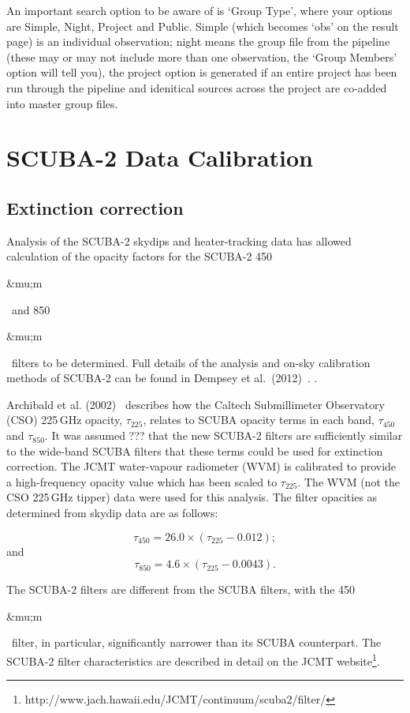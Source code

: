 \documentclass[twoside,11pt]{article}
\newcommand{\micron}{\mbox{\,${\umu}$m}}            %
\newcounter{box}
\newcommand{\htmladdnormallinkfoot}[2]{#1\footnote{#2}}
\newcommand{\xlabel}[1]{}
\renewcommand{\_}{\texttt{\symbol{95}}}
\renewcommand{\micron}{\begin{rawhtml}&mu;m\end{rawhtml}}
\begin{document}
An important search option to be aware of is `Group Type', where your options are Simple, Night, Project and Public. Simple (which becomes `obs' on the result page) is an individual observation; night means the group file from the pipeline (these may or may not include more than one observation, the `Group Members' option will tell you), the project option is generated if an entire project has been run through the pipeline and idenitical sources across the project are co-added into master group files.

\clearpage
\section{\xlabel{calib}SCUBA-2 Data Calibration}
\label{sec:cal}

\subsection{\xlabel{extinction}Extinction correction}

Analysis of the SCUBA-2 skydips and heater-tracking data has allowed calculation of the opacity factors for the SCUBA-2 450\micron\ and 850\micron\ filters to be determined. Full details of the analysis and on-sky calibration methods of SCUBA-2 can be found in Dempsey et al.\ (2012)~\cite{dempsey12}. \cite{dempsey-spie}.

Archibald et al. (2002)~\cite{archibald} describes how the Caltech Submillimeter Observatory (CSO) 225\,GHz opacity, $\tau_{225}$, relates to SCUBA opacity terms in each band, $\tau_{450}$ and $\tau_{850}$. It was assumed ??? that the new SCUBA-2 filters are sufficiently similar to the wide-band SCUBA filters that these terms could be used for extinction correction.  The JCMT water-vapour radiometer (WVM) is calibrated to provide a high-frequency opacity value which has been scaled to $\tau_{225}$. The WVM (not the CSO 225\,GHz tipper) data were used for this analysis. The filter opacities as determined from skydip data are as follows:

\begin{equation}
\tau_{450} = 26.0 \times (\tau_{225} - 0.012);
\end{equation}
and
\begin{equation}
\tau_{850} = 4.6 \times (\tau_{225} - 0.0043).
\end{equation}

The SCUBA-2 filters are different from the SCUBA filters, with the 450\micron\ filter, in particular, significantly narrower than its SCUBA counterpart. The SCUBA-2 filter characteristics are described in detail \htmladdnormallinkfoot{on the JCMT  website}{http://www.jach.hawaii.edu/JCMT/continuum/scuba2/filter/}.
\end{document}
